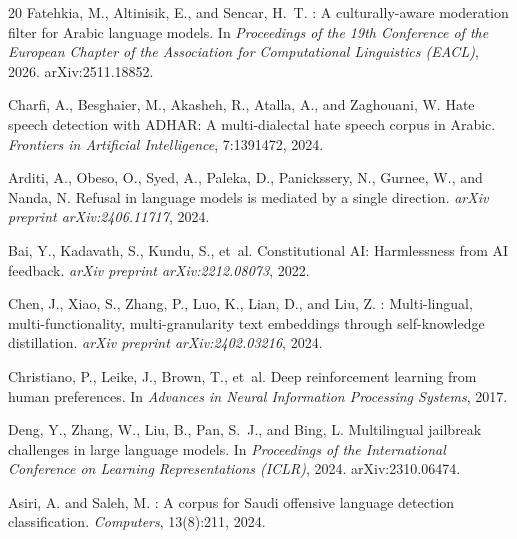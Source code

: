\documentclass[11pt]{article}
\begin{document}
\begin{thebibliography}{20}
Fatehkia, M., Altinisik, E., and Sencar, H.~T.
: A culturally-aware moderation filter for {Arabic} language models.
\newblock In \emph{Proceedings of the 19th Conference of the European Chapter of the Association for Computational Linguistics (EACL)}, 2026.
\newblock arXiv:2511.18852.

Charfi, A., Besghaier, M., Akasheh, R., Atalla, A., and Zaghouani, W.
\newblock Hate speech detection with {ADHAR}: A multi-dialectal hate speech corpus in {Arabic}.
\newblock \emph{Frontiers in Artificial Intelligence}, 7:1391472, 2024.

Arditi, A., Obeso, O., Syed, A., Paleka, D., Panickssery, N., Gurnee, W., and Nanda, N.
\newblock Refusal in language models is mediated by a single direction.
\newblock \emph{arXiv preprint arXiv:2406.11717}, 2024.

Bai, Y., Kadavath, S., Kundu, S., et~al.
\newblock Constitutional {AI}: Harmlessness from {AI} feedback.
\newblock \emph{arXiv preprint arXiv:2212.08073}, 2022.

Chen, J., Xiao, S., Zhang, P., Luo, K., Lian, D., and Liu, Z.
: Multi-lingual, multi-functionality, multi-granularity text embeddings through self-knowledge distillation.
\newblock \emph{arXiv preprint arXiv:2402.03216}, 2024.

Christiano, P., Leike, J., Brown, T., et~al.
\newblock Deep reinforcement learning from human preferences.
\newblock In \emph{Advances in Neural Information Processing Systems}, 2017.

Deng, Y., Zhang, W., Liu, B., Pan, S.~J., and Bing, L.
\newblock Multilingual jailbreak challenges in large language models.
\newblock In \emph{Proceedings of the International Conference on Learning Representations (ICLR)}, 2024.
\newblock arXiv:2310.06474.

Asiri, A. and Saleh, M.
: A corpus for {Saudi} offensive language detection classification.
\newblock \emph{Computers}, 13(8):211, 2024.


\end{thebibliography}
\end{document}
